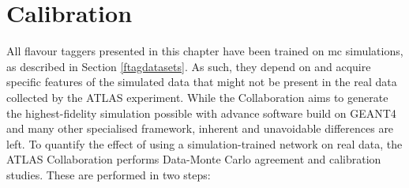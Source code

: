 \section{Calibration}\label{chap-calibration}
All flavour taggers presented in this chapter have been trained on \gls{mc} simulations, as described in Section \ref{ftagdatasets}. As such, they depend on and acquire specific features of the simulated data that might not be present in the real data collected by the ATLAS experiment. While the Collaboration aims to generate the highest-fidelity simulation possible with advance software build on GEANT4 \cite{Agostinelli:602040} and many other specialised framework, inherent and unavoidable differences are left. To quantify the effect of using a simulation-trained network on real data, the ATLAS Collaboration performs Data-Monte Carlo agreement and calibration studies. These are performed in two steps: 
